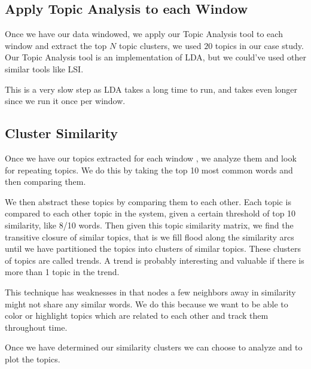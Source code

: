 \documentclass[times, 10pt,twocolumn]{article}
\begin{document}
\subsection{Apply Topic Analysis to each Window}

Once we have our data windowed, we apply our Topic Analysis tool to
each window and extract the top $N$ topic clusters, we used $20$
topics in our case study. Our Topic Analysis tool is an implementation
of LDA, but we could've used other similar tools like LSI.

This is a very slow step as LDA takes a long time to run, and takes
even longer since we run it once per window.





\subsection{Cluster Similarity}


Once we have our topics extracted for each window , we analyze them
and look for repeating topics. We do this by taking the top 10 most
common words and then comparing them. 

We then abstract these topics by comparing them to each other.  Each
topic is compared to each other topic in the system, given a certain
threshold of top 10 similarity, like 8/10 words. Then given this topic
similarity matrix, we find the transitive closure of similar topics,
that is we fill flood along the similarity arcs until we have
partitioned the topics into clusters of similar topics.  These
clusters of topics are called trends. A trend is probably interesting
and valuable if there is more than 1 topic in the trend.

This technique has weaknesses in that nodes a few neighbors away in
similarity might not share any similar words.  We do this because we
want to be able to color or highlight topics which are related to each
other and track them throughout time.

Once we have determined our similarity clusters we can choose to
analyze and to plot the topics.

\end{document}
